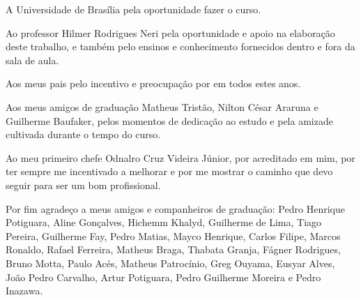 \begin{agradecimentos}

A Universidade de Brasília pela oportunidade fazer o curso.

Ao professor Hilmer Rodrigues Neri pela oportunidade e apoio na elaboração deste trabalho, e também pelo ensinos e conhecimento fornecidos dentro e fora da sala de aula.

Aos meus pais pelo incentivo e preocupação por em todos estes anos.

Aos meus amigos de graduação Matheus Tristão, Nilton César Araruna e Guilherme Baufaker, pelos momentos de dedicação ao estudo e pela amizade cultivada durante o tempo do curso.

Ao meu primeiro chefe Odnalro Cruz Videira Júnior, por acreditado em mim, por ter sempre me incentivado a melhorar e por me mostrar o caminho que devo seguir para ser um bom profissional.

Por fim agradeço a meus amigos e companheiros de graduação: Pedro Henrique Potiguara, Aline Gonçalves, Hichemm Khalyd, Guilherme de Lima,  Tiago Pereira, Guilherme Fay, Pedro Matias, Mayco Henrique, Carlos Filipe, Marcos Ronaldo, Rafael Ferreira, Matheus Braga, Thabata Granja, Fágner Rodrigues, Bruno Motta, Paulo Acés, Matheus Patrocínio, Greg Ouyama, Eusyar Alves, João Pedro Carvalho, Artur Potiguara, Pedro Guilherme Moreira e Pedro Inazawa.


\end{agradecimentos}

